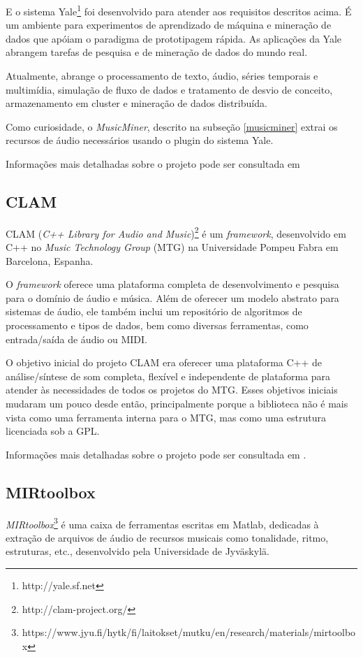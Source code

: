 E o sistema Yale\footnote{http://yale.sf.net} foi desenvolvido para atender aos requisitos descritos acima. É um ambiente para experimentos de aprendizado de máquina e mineração de dados que apóiam o paradigma de prototipagem rápida. As aplicações da Yale abrangem tarefas de pesquisa e de mineração de dados do mundo real.

Atualmente, abrange o processamento de texto, áudio, séries temporais e multimídia, simulação de fluxo de dados e tratamento de desvio de conceito, armazenamento em cluster e mineração de dados distribuída.

Como curiosidade, o \textit{MusicMiner}, descrito na subseção \ref{musicminer} extrai os recursos de áudio necessários usando o plugin do sistema Yale.

Informações mais detalhadas sobre o projeto pode ser consultada em \cite{mierswa2006}

\subsection{CLAM}
CLAM (\textit{C++ Library for Audio and Music})\footnote{http://clam-project.org/} é um \textit{framework}, desenvolvido em C++ no \textit{Music Technology Group} (MTG) na Universidade Pompeu Fabra em Barcelona, Espanha.

O \textit{framework} oferece uma plataforma completa de desenvolvimento e pesquisa para o domínio de áudio e música. Além de oferecer um modelo abstrato para sistemas de áudio, ele também inclui um repositório de algoritmos de processamento e tipos de dados, bem como diversas ferramentas, como entrada/saída de áudio ou MIDI.

O objetivo inicial do projeto CLAM era oferecer uma plataforma C++ de análise/síntese de som completa, flexível e independente de plataforma para atender às necessidades de todos os projetos do MTG. Esses objetivos iniciais mudaram um pouco desde então, principalmente porque a biblioteca não é mais vista como uma ferramenta interna para o MTG, mas como uma estrutura licenciada sob a GPL.

Informações mais detalhadas sobre o projeto pode ser consultada em \cite{amatriain2007}.

\subsection{MIRtoolbox}
\textit{MIRtoolbox}\footnote{https://www.jyu.fi/hytk/fi/laitokset/mutku/en/research/materials/mirtoolbox} é uma caixa de ferramentas escritas em Matlab, dedicadas à extração de arquivos de áudio de recursos musicais como tonalidade, ritmo, estruturas, etc., desenvolvido pela Universidade de Jyväskylä.

